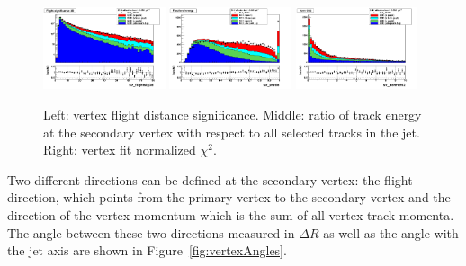 \begin{figure}[h!]
\centering
\includegraphics[width=0.32\textwidth]{figures/sv_flightsig3d_Log.png}
\includegraphics[width=0.32\textwidth]{figures/sv_eratio_Linear.png}
\includegraphics[width=0.32\textwidth]{figures/sv_normchi2_Linear.png}
\caption{Left: vertex flight distance significance. Middle: ratio of track energy at the secondary vertex with respect to all selected tracks in the jet. Right: vertex fit normalized $\chi^2$. }
\label{fig:vertexdistance}
\end{figure}

Two different directions can be defined at the secondary vertex: the flight direction, which points from the primary vertex to the secondary vertex and the direction of the vertex momentum which is the sum of all vertex track momenta. The angle between these two directions measured in $\Delta R$ as well as the angle with the jet axis are shown in Figure~\ref{fig:vertexAngles}.

